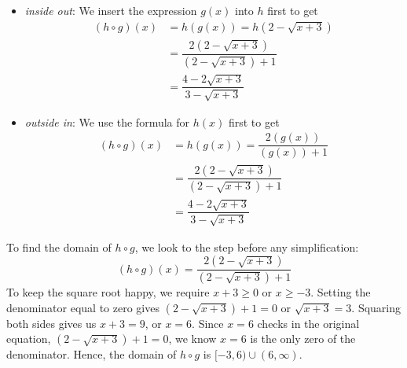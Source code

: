{\begin{itemize}

\item  \textit{inside out}: We insert the expression $g(x)$ into $h$ first to get
\begin{align*}
(h \circ g)(x) & = h(g(x)) =h\left(2-\sqrt{x+3}\right) \\
 & = \dfrac{2 \left(2-\sqrt{x+3} \right)}{\left(2-\sqrt{x+3}\right)+1}\\
 & = \dfrac{4-2\sqrt{x+3}}{3-\sqrt{x+3}}
  \end{align*}

\item  \textit{outside in}:  We use the formula for $h(x)$ first to get
\begin{align*}
(h \circ g)(x) & = h(g(x)) = \dfrac{2 \left(g(x)\right)}{\left( g(x)\right) + 1}\\
 & = \dfrac{2 \left(2-\sqrt{x+3} \right)}{\left(2-\sqrt{x+3}\right)+1}\\
 & =  \dfrac{4-2\sqrt{x+3}}{3-\sqrt{x+3}}
 \end{align*}
 
 \end{itemize}



To find the domain of $h \circ g$, we look to the step before any simplification:  \[(h \circ g)(x) =  \frac{2 \left(2-\sqrt{x+3} \right)}{\left(2-\sqrt{x+3}\right)+1}\]  To keep the square root happy, we require $x+3 \geq 0$ or $x \geq -3$.  Setting the denominator equal to zero gives $\left(2-\sqrt{x+3}\right)+1=0$ or $\sqrt{x+3} = 3$.  Squaring both sides gives us $x+3=9$, or $x=6$.  Since $x=6$ checks in the original equation, $\left(2-\sqrt{x+3}\right)+1=0$, we know $x=6$ is the only zero of the denominator.  Hence, the domain of $h \circ g$ is $[-3,6) \cup (6, \infty)$.
}



\medskip

